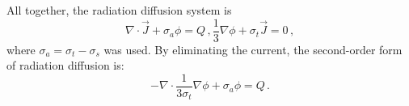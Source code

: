 \documentclass[../doc.tex]{subfiles}
\begin{document}
All together, the radiation diffusion system is 
	\begin{subequations}
	\begin{equation}
		\nabla\cdot\vec{J} + \sigma_a \phi = Q \,, 
	\end{equation}
	\begin{equation}
		\frac{1}{3}\nabla\phi + \sigma_t \vec{J} = 0 \,, 
	\end{equation}
	\end{subequations}
where $\sigma_a = \sigma_t - \sigma_s$ was used. By eliminating the current, the second-order form of radiation diffusion is: 
	\begin{equation}
		-\nabla\cdot \frac{1}{3\sigma_t} \nabla\phi + \sigma_a \phi = Q \,. 
	\end{equation}
\end{document}

